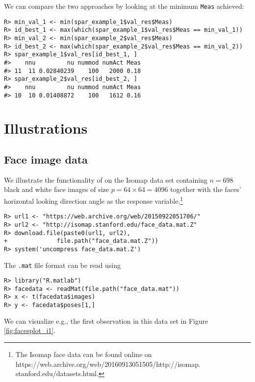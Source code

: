 \documentclass[
  article]{jss}
\begin{document}
We can compare the two approaches by looking at the minimum
\texttt{Meas} achieved:

\begin{verbatim}
R> min_val_1 <- min(spar_example_1$val_res$Meas)
R> id_best_1 <- max(which(spar_example_1$val_res$Meas == min_val_1))
R> min_val_2 <- min(spar_example_2$val_res$Meas)
R> id_best_2 <- max(which(spar_example_2$val_res$Meas == min_val_2))
R> spar_example_1$val_res[id_best_1, ]
#>    nnu         nu nummod numAct Meas
#> 11  11 0.02840239    100   2000 0.18
R> spar_example_2$val_res[id_best_2, ]
#>    nnu         nu nummod numAct Meas
#> 10  10 0.01408872    100   1612 0.16
\end{verbatim}

\section{Illustrations}\label{sec-illustrations}

\subsection{Face image data}\label{face-image-data}

We illustrate the functionality of  on the Isomap data set
containing \(n = 698\) black and white face images of size
\(p = 64 \times 64 = 4096\) together with the faces' horizontal looking
direction angle as the response variable.\footnote{
The Isomap face data can be found online on https://web.archive.org/web/20160913051505/http://isomap.
stanford.edu/datasets.html.}

\begin{verbatim}
R> url1 <- "https://web.archive.org/web/20150922051706/"
R> url2 <- "http://isomap.stanford.edu/face_data.mat.Z"
R> download.file(paste0(url1, url2),
+              file.path("face_data.mat.Z"))
R> system('uncompress face_data.mat.Z')
\end{verbatim}

The \texttt{.mat} file format can be read using 
\citep{pkg:rmatlab}

\begin{verbatim}
R> library("R.matlab")
R> facedata <- readMat(file.path("face_data.mat"))
R> x <- t(facedata$images)
R> y <- facedata$poses[1,]
\end{verbatim}

We can visualize e.g., the first observation in this data set in Figure
\ref{fig:facesplot_i1}.
\end{document}
